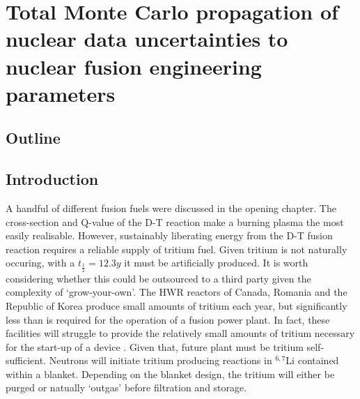 
\chapter{Total Monte Carlo propagation of nuclear data uncertainties to nuclear fusion engineering parameters} %
\label{chap:tmc}

\ifpdf
    \graphicspath{{Chapter1/Figs/Raster/}{Chapter1/Figs/PDF/}{Chapter1/Figs/}}
\else
    \graphicspath{{Chapter1/Figs/Vector/}{Chapter1/Figs/}}
\fi


\section{Outline}


\section{Introduction}

\label{introduction}
A handful of different fusion fuels were discussed in the opening chapter. The cross-section and Q-value of the D-T reaction make a burning plasma the most easily realisable. However, sustainably liberating energy from the D-T fusion reaction requires a reliable supply of tritium fuel. Given tritium is not naturally occuring, with a $t_{\frac{1}{2}}=12.3y$  it must be artificially produced. It is worth considering whether this could be outsourced to a third party given the complexity of `grow-your-own'. The HWR reactors of Canada, Romania and the Republic of Korea produce small amounts of tritium each year, but significantly less than is required for the operation of a fusion power plant. In fact, these facilities will struggle to provide the relatively small amounts of tritium necessary for the start-up of a device \cite{Kovari2018}. Given that, future plant must be tritium self-sufficient. Neutrons will initiate tritium producing reactions in $^{6,7}$Li contained within a blanket. Depending on the blanket design, the tritium will either be purged or natually `outgas' before filtration and storage. 

